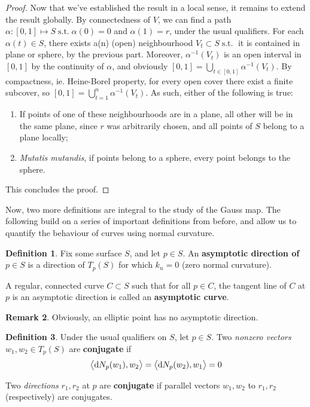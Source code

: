 \documentclass{amsart} %
\theoremstyle{mytheoremstyle}
\theoremstyle{definition}
\newtheorem{definition}{Definition}[section]
\newtheorem{remark}[definition]{Remark}
\numberwithin{equation}{section}
\DeclareMathOperator{\1}{\mathbbm{1}}
\DeclareMathOperator{\suchthat}{\text{ s.t. }}
\DeclareMathOperator{\D}{\dif}
\newcommand{\innerproduct}[2]{\left\langle #1,#2 \right\rangle}
\begin{document}
\begin{proof}
	Now that we've established the result in a local sense, it remains to extend the result globally. By connectedness of $V$, we can find a path $\alpha:[0,1] \mapsto S \suchthat \alpha(0) = 0$ and $\alpha(1) = r$, under the usual qualifiers. For each $\alpha(t) \in S$, there exists a(n) (open) neighbourhood $V_t \subset S \suchthat $ it is contained in plane or sphere, by the previous part. Moreover, $\alpha^{-1} (V_t)$ is an open interval in $[0,1]$ by the continuity of $\alpha$, and obviously $[0,1] = \bigcup_{t \in [0,1]} \alpha^{-1} (V_t)$. By compactness, ie. Heine-Borel property, for every open cover there exist a finite subcover, so $[0,1] = \bigcup_{t =1}^{n} \alpha^{-1} (V_t)$. As such, either of the following is true:
	\begin{enumerate}
		\item If points of one of these neighbourhoods are in a plane, all other will be in the same plane, since $r$ was arbitrarily chosen, and all points of $S$ belong to a plane locally;
		\item \textit{Mutatis mutandis}, if points belong to a sphere, every point belongs to the sphere.
	\end{enumerate}
	This concludes the proof.
\end{proof}

Now, two more definitions are integral to the study of the Gauss map. The following build on a series of important definitions from before, and allow us to quantify the behaviour of curves using normal curvature.


\begin{definition}
	\label{defasymptoticdirectioncurve}
	Fix some surface $S$, and let $p \in S$. An \textbf{asymptotic direction of $p \in S$} is a direction of $T_p (S)$ for which $k_n = 0$ (zero normal curvature).
	
	A regular, connected curve $C \subset S$ such that for all $p \in C$, the tangent line of $C$ at $p$ is an asymptotic direction is called an \textbf{asymptotic curve}.
\end{definition}

\begin{remark}
	Obviously, an elliptic point has no asymptotic direction.
\end{remark}

\begin{definition}
	\label{defconjugatedirectioncurve}
	Under the usual qualifiers on $S$, let $p \in S$. Two \textit{nonzero vectors} $w_1,w_2 \in T_p (S)$ are \textbf{conjugate} if
	\begin{align}
		\label{eqconjugate}
		\innerproduct{\D N_p (w_1)}{w_2} = \innerproduct{\D N_p (w_2)}{w_1} = 0
	\end{align}
	
	Two \textit{directions} $r_1,r_2$ at $p$ are \textbf{conjugate} if parallel vectors $w_1, w_2 $ to $r_1, r_2$ (respectively) are conjugates.
\end{definition}
\end{document}
